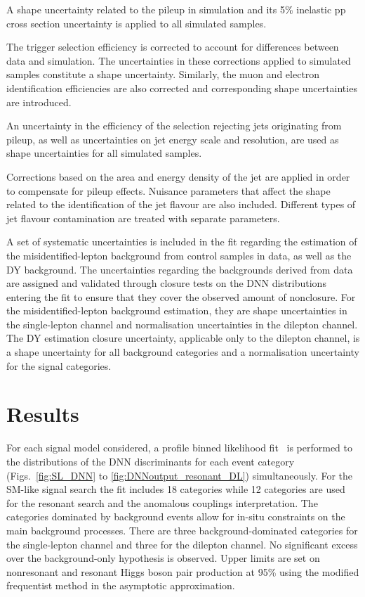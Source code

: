 A shape uncertainty related to the pileup in simulation and its 5\% \cite{CMS:2018mlc} inelastic pp cross section uncertainty is applied to all simulated samples.


The trigger selection efficiency is corrected to account for differences between data and simulation.
The uncertainties in these corrections applied to simulated samples constitute a shape uncertainty. Similarly, the muon and electron identification efficiencies are also corrected and corresponding shape uncertainties are introduced.

An uncertainty in the efficiency of the selection rejecting jets originating from pileup, as well as uncertainties on jet energy scale and resolution, are used as shape uncertainties for all simulated samples.

Corrections based on the area and energy density of the jet are applied in order to compensate for pileup effects.
Nuisance parameters that affect the shape related to the identification of the jet flavour are also included. Different types of jet flavour contamination are treated with separate parameters.

A set of systematic uncertainties is included in the fit regarding the estimation of the misidentified-lepton background from control samples in data, as well as the DY background.
The uncertainties regarding the backgrounds derived from data are assigned and validated through closure tests on the DNN distributions entering the fit to ensure that they cover the observed amount of nonclosure.
For the misidentified-lepton background estimation, they are shape uncertainties in the single-lepton channel and normalisation uncertainties in the dilepton channel.
The DY estimation closure uncertainty, applicable only to the dilepton channel, is a shape uncertainty for all background categories and a normalisation uncertainty for the \HH signal categories.





\section{Results}\label{final_results}
For each signal model considered, a profile binned likelihood fit~\cite{CLSA, CLS1, CLS2} is performed to the distributions of the DNN discriminants for each event category (Figs.~\ref{fig:SL_DNN} to \ref{fig:DNNoutput_resonant_DL}) simultaneously.
For the SM-like signal search the fit includes 18 categories while 12 categories are used for the resonant search and the anomalous couplings interpretation. The categories dominated by background events allow for in-situ constraints on the main background processes.
There are three background-dominated categories for the single-lepton channel and three for the dilepton channel.
No significant excess over the background-only hypothesis is observed. Upper limits are set on nonresonant and resonant Higgs boson pair production at 95\% \CL using the modified frequentist \CLs method in the asymptotic approximation.

